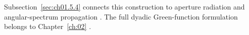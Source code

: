 
Subsection~\ref{sec:ch01.5.4} connects this construction to aperture radiation and angular-spectrum propagation \cite{stratton1941}. The full dyadic Green-function formulation belongs to Chapter~\ref{ch:02} \cite{harrington2001,tai1994}.
